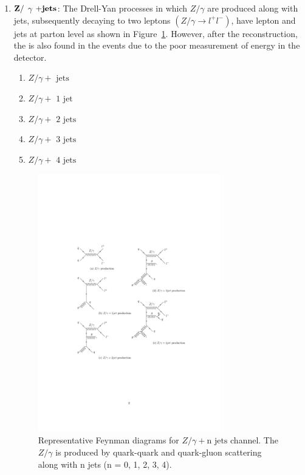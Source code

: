 \begin{enumerate}
\item ${\bf{Z/}}$ $\gamma$ ${\bf{+ jets}}$: The Drell-Yan processes in 
    which $Z/\gamma$ are produced along with jets, subsequently 
    decaying to two leptons $(Z/\gamma \rightarrow l^+ l^-)$, have 
    lepton and jets at parton level as shown in 
    Figure~\ref{fig:feyn_diag_dyjet}. However, after the 
    reconstruction, the \MET is also found in the events due to the 
    poor measurement of energy in the detector.
	\begin{enumerate}
  	\item $Z/\gamma +\text{ jets   }$
  	\item $Z/\gamma +\text{ 1 jet  }$
  	\item $Z/\gamma +\text{ 2 jets }$
  	\item $Z/\gamma +\text{ 3 jets }$
  	\item $Z/\gamma +\text{ 4 jets }$
  	\end{enumerate}
	\begin{figure}
	\begin{center}
	\includegraphics[width=0.75\textwidth]{Image/FeynDiag/feyn_diag_dyjet.pdf}
	\caption{Representative Feynman diagrams for $ Z/\gamma + \text{n jets}$ channel. 
	The $Z/\gamma$ is produced by quark-quark and quark-gluon scattering 
	along with n jets (n = 0, 1, 2, 3, 4).}
	\label{fig:feyn_diag_dyjet}
	\end{center}
	\end{figure}


\end{enumerate}
